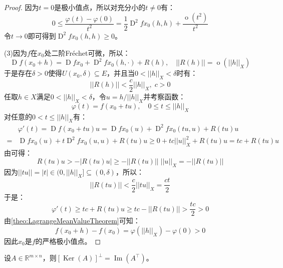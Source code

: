\begin{proof}
	因为$t=0$是极小值点，所以对充分小的$t\ne0$有：
	\begin{equation*}
		0\leqslant\frac{\varphi(t)-\varphi(0)}{t^2}
		=\frac{1}{2}\operatorname{D}^2fx_0(h,h)+\frac{\operatorname{o}(t^2)}{t^2}
	\end{equation*}
	令$t\to0$即可得到$\operatorname{D}^2fx_0(h,h)\geqslant0$。\par
	(3)因为$f$在$x_0$处二阶Fr\'echet可微，所以：
	\begin{equation*}
		\operatorname{D}f(x_0+h)=\operatorname{D}fx_0+\operatorname{D}^2fx_0(h,\cdot)+R(h),\quad
		||R(h)||=\operatorname{o}(||h||_X)
	\end{equation*}
	于是存在$\delta>0$使得$U(x_0,\delta)\subseteq E$，并且当$0<||h||_X<\delta$时有：
	\begin{equation*}
		||R(h)||<\frac{c}{2}||h||_X,\;c>0
	\end{equation*}
	任取$h\in X$满足$0<||h||_X<\delta$，令$u=h/||h||_X$并考察函数：
	\begin{equation*}
		\varphi(t)=f(x_0+tu),\quad0\leqslant t\leqslant||h||_X
	\end{equation*}
	对任意的$0<t\leqslant||h||_X$有：
	\begin{align*}
		&\varphi'(t)=\operatorname{D}f(x_0+tu)u=\operatorname{D}fx_0(u)+\operatorname{D}^2fx_0(tu,u)+R(tu)u \\
		=&\operatorname{D}fx_0(u)+t\operatorname{D}^2fx_0(u,u)+R(tu)u\geqslant0+tc||u||_X^2+R(tu)u=tc+R(tu)u
	\end{align*}
	由可得：
	\begin{equation*}
		R(tu)u>-|R(tu)u|\geqslant-||R(tu)||\;||u||_X=-||R(tu)||
	\end{equation*}
	因为$||tu||=|t|\in(0,||h||_X]\subseteq(0,\delta)$，所以：
	\begin{equation*}
		||R(tu)||<\frac{c}{2}||tu||_X=\frac{ct}{2}
	\end{equation*}
	于是：
	\begin{equation*}
		\varphi'(t)\geqslant tc+R(tu)u\geqslant tc-||R(tu)||>\frac{tc}{2}>0
	\end{equation*}
	由\cref{theo:LagrangeMeanValueTheorem}可知：
	\begin{equation*}
		f(x_0+h)-f(x_0)=\varphi(||h||_X)-\varphi(0)>0
	\end{equation*}
	因此$x_0$是$f$的严格极小值点。
\end{proof}
\begin{lemma}
	设$A\in\mathbb{R}^{m\times n}$，则$[\operatorname{Ker}(A)]^\perp=\operatorname{Im}(A^{\top})$。
\end{lemma}
